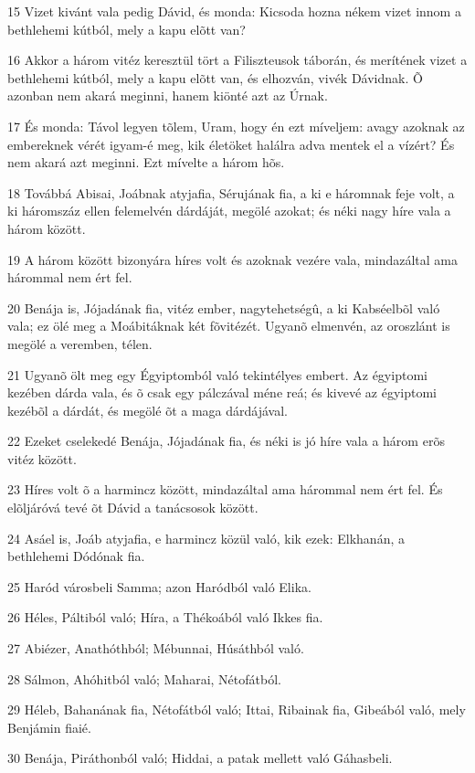 \par 15 Vizet kivánt vala pedig Dávid, és monda: Kicsoda hozna nékem vizet innom a bethlehemi kútból, mely a kapu elõtt van?
\par 16 Akkor a három vitéz keresztül tört a Filiszteusok táborán, és merítének vizet a bethlehemi kútból, mely a kapu elõtt van, és elhozván, vivék Dávidnak. Õ azonban nem akará meginni, hanem kiönté azt az Úrnak.
\par 17 És monda: Távol legyen tõlem, Uram, hogy én ezt míveljem: avagy azoknak az embereknek vérét igyam-é meg, kik életöket halálra adva mentek el a vízért? És nem akará azt meginni. Ezt mívelte a három hõs.
\par 18 Továbbá Abisai, Joábnak atyjafia, Sérujának fia, a ki e háromnak feje volt, a ki háromszáz ellen felemelvén dárdáját, megölé azokat; és néki nagy híre vala a három  között.
\par 19 A három között bizonyára híres volt és azoknak vezére vala, mindazáltal ama hárommal nem ért fel.
\par 20 Benája is, Jójadának fia, vitéz ember, nagytehetségû, a ki  Kabséelbõl való vala; ez ölé meg a Moábitáknak két fõvitézét. Ugyanõ elmenvén, az oroszlánt is megölé a veremben, télen.
\par 21 Ugyanõ ölt meg egy Égyiptomból való tekintélyes embert. Az égyiptomi kezében dárda vala, és õ csak egy pálczával méne reá; és kivevé az égyiptomi kezébõl a dárdát, és megölé õt a maga dárdájával.
\par 22 Ezeket cselekedé Benája, Jójadának fia, és néki is jó híre vala a három erõs vitéz között.
\par 23 Híres volt õ a harmincz között, mindazáltal ama hárommal nem ért fel. És elõljáróvá tevé õt Dávid a tanácsosok között.
\par 24 Asáel is, Joáb atyjafia, e harmincz közül való, kik ezek: Elkhanán, a bethlehemi  Dódónak fia.
\par 25 Haród városbeli Samma; azon Haródból való Elika.
\par 26 Héles, Páltiból való; Híra, a Thékoából való Ikkes fia.
\par 27 Abiézer, Anathóthból; Mébunnai, Húsáthból való.
\par 28 Sálmon, Ahóhitból való; Maharai, Nétofátból.
\par 29 Héleb, Bahanának fia, Nétofátból való; Ittai, Ribainak fia, Gibeából való, mely Benjámin fiaié.
\par 30 Benája, Piráthonból való; Hiddai, a patak mellett való Gáhasbeli.
